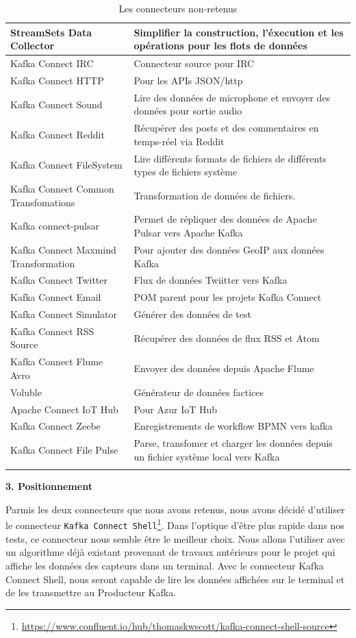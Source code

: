 \documentclass{article}
\begin{document}
\begin{longtable}{|p{7.5cm}|p{7.5cm}|}
				StreamSets Data Collector & Simplifier la construction, l’éxecution et les opérations pour les flots de données\\\hline
				Kafka Connect IRC & Connecteur source pour IRC\\\hline
				Kafka Connect HTTP & Pour les APIs JSON/http\\\hline
				Kafka Connect Sound & Lire des données de microphone et envoyer des données pour sortie audio\\\hline
				Kafka Connect Reddit & Récupérer des posts et des commentaires en temps-réel via Reddit\\\hline
				Kafka Connect FileSystem & Lire différents formats de fichiers de différents types de fichiers système\\\hline
				Kafka Connect Common Transfomations & Transformation de données de fichiers.\\\hline
				Kafka connect-pulsar & Permet de répliquer des données de Apache Pulsar vers Apache Kafka\\\hline
				Kafka Connect Maxmind Transformation & Pour ajouter des données GeoIP aux données Kafka\\\hline
				Kafka Connect Twitter & Flux de données Twiitter vers Kafka\\\hline
				Kafka Connect Email & POM parent pour les projets Kafka Connect\\\hline
				Kafka Connect Simulator & Générer des données de test\\\hline
				Kafka Connect RSS Source & Récupérer des données de flux RSS et Atom\\\hline
				Kafka Connect Flume Avro & Envoyer des données depuis Apache Flume\\\hline
				Voluble & Générateur de données factices\\\hline
				Apache Connect IoT Hub & Pour Azur IoT Hub\\\hline
				Kafka Connect Zeebe	& Enregistrements de workflow BPMN vers kafka\\\hline
				Kafka Connect File Pulse & Parse, transfomer et charger les données  depuis un fichier système local vers Kafka\\\hline
				\caption{Les connecteurs non-retenus}
				\label{tab:connecteursnon}
			\end{longtable}\par
			\textbf{3. Positionnement}\par
			Parmis les deux connecteurs que nous avons retenus, nous avons décidé d'utiliser le connecteur \texttt{Kafka Connect Shell}\footnote{\href{https://www.confluent.io/hub/thomaskwscott/kafka-connect-shell-source}{https://www.confluent.io/hub/thomaskwscott/kafka-connect-shell-source}}.
			Dans l'optique d'être plus rapide dans nos tests, ce connecteur nous semble être le meilleur choix.
			Nous allons l'utiliser avec un algorithme déjà existant provenant de travaux antérieurs pour le projet qui affiche les données des capteurs dans un terminal.
			Avec le connecteur Kafka Connect Shell, nous seront capable de lire les données affichées sur le terminal et de les transmettre au Producteur Kafka.
\end{document}
